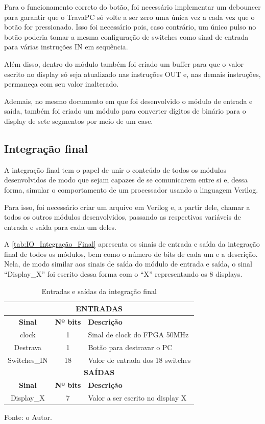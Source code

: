 \documentclass[
	12pt,				%
	oneside,
	a4paper,			%
	english,			%
	french,				%
	spanish,			%
	brazil,				%
	]{abntex2}
\begin{document}
Para o funcionamento correto do botão, foi necessário implementar um debouncer para garantir que o TravaPC só volte a ser zero uma única vez a cada vez que o botão for pressionado. Isso foi necessário pois, caso contrário, um único pulso no botão poderia tomar a mesma configuração de switches como sinal de entrada para várias instruções IN em sequência.

Além disso, dentro do módulo também foi criado um buffer para que o valor escrito no display só seja atualizado nas instruções OUT e, nas demais instruções, permaneça com seu valor inalterado.

Ademais, no mesmo documento em que foi desenvolvido o módulo de entrada e saída, também foi criado um módulo para converter dígitos de binário para o display de sete segmentos por meio de um case.

\subsection{Integração final}

A integração final tem o papel de unir o conteúdo de todos os módulos desenvolvidos de modo que sejam capazes de se comunicarem entre si e, dessa forma, simular o comportamento de um processador usando a linguagem Verilog.

Para isso, foi necessário criar um arquivo em Verilog e, a partir dele, chamar a todos os outros módulos desenvolvidos, passando as respectivas variáveis de entrada e saída para cada um deles.

A \autoref{tab:IO_Integração_Final} apresenta os sinais de entrada e saída da integração final de todos os módulos, bem como o número de bits de cada um e a descrição. Nela, de modo similar aos sinais de saída do módulo de entrada e saída, o sinal ``Display\_X'' foi escrito dessa forma com o ``X'' representando os 8 displays.

\setlength{\tabcolsep}{10pt} %
\begin{table}[H]
\centering
\caption{Entradas e saídas da integração final}
\label{tab:IO_Integração_Final}
\begin{tabular}{|c|c|l|}
\hline
\multicolumn{3}{|c|}{\textbf{ENTRADAS}} \\
\hline
\textbf{Sinal} & \textbf{Nº bits} & \textbf{Descrição} \\
\hline
clock & 1 & Sinal de clock do FPGA 50MHz\\
\hline
Destrava & 1 & Botão para destravar o PC \\
\hline
Switches\_IN & 18 & Valor de entrada dos 18 switches \\
\hline
\multicolumn{3}{|c|}{\textbf{SAÍDAS}} \\
\hline
\textbf{Sinal} & \textbf{Nº bits} & \textbf{Descrição} \\
\hline
Display\_X & 7 & Valor a ser escrito no display X \\
\hline
\end{tabular}
\vspace{-0.5em}
\begin{center}
Fonte: o Autor.
\end{center}
\end{table} 
\end{document}
